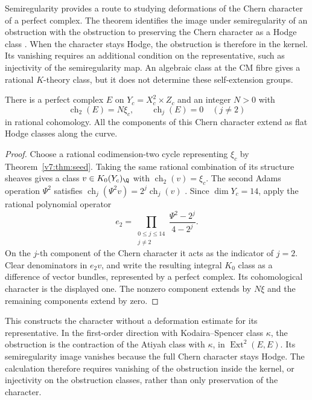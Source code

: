 Semiregularity provides a route to studying deformations of the Chern character of a perfect complex. The theorem identifies the image under semiregularity of an obstruction with the obstruction to preserving the Chern character as a Hodge class \cite{Pri24}. When the character stays Hodge, the obstruction is therefore in the kernel. Its vanishing requires an additional condition on the representative, such as injectivity of the semiregularity map. An algebraic class at the CM fibre gives a rational \(K\)-theory class, but it does not determine these self-extension groups.

\begin{proposition}\label{v7:prop:adams}
There is a perfect complex \(E\) on \(Y_c=X_c^2\times Z_c\) and an integer \(N>0\) with
\[
 \operatorname{ch}_2(E)=N\xi_c,\qquad
 \operatorname{ch}_j(E)=0\quad(j\ne2)
\]
in rational cohomology. All the components of this Chern character extend as flat Hodge classes along the curve.
\end{proposition}
\begin{proof}
Choose a rational codimension-two cycle representing \(\xi_c\) by Theorem~\ref{v7:thm:seed}. Taking the same rational combination of its structure sheaves gives a class \(v\in K_0(Y_c)_\Q\) with \(\operatorname{ch}_2(v)=\xi_c\). The second Adams operation \(\Psi^2\) satisfies \(\operatorname{ch}_j(\Psi^2v)=2^j\operatorname{ch}_j(v)\) \cite{Ful98}. Since \(\dim Y_c=14\), apply the rational polynomial operator
\[
 e_2=\prod_{\substack{0\le j\le14\\j\ne2}}
              \frac{\Psi^2-2^j}{4-2^j}.
\]
On the \(j\)-th component of the Chern character it acts as the indicator of \(j=2\). Clear denominators in \(e_2v\), and write the resulting integral \(K_0\) class as a difference of vector bundles, represented by a perfect complex. Its cohomological character is the displayed one. The nonzero component extends by \(N\xi\) and the remaining components extend by zero.
\end{proof}

This constructs the character without a deformation estimate for its representative. In the first-order direction with Kodaira--Spencer class \(\kappa\), the obstruction is the contraction of the Atiyah class with \(\kappa\), in \(\operatorname{Ext}^2(E,E)\). Its semiregularity image vanishes because the full Chern character stays Hodge. The calculation therefore requires vanishing of the obstruction inside the kernel, or injectivity on the obstruction classes, rather than only preservation of the character.

